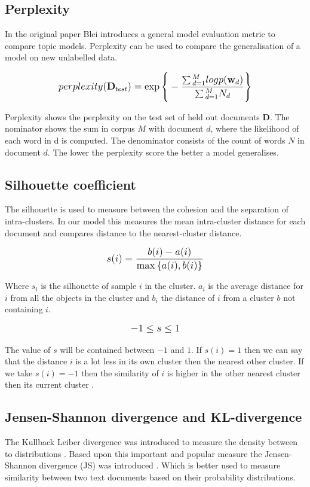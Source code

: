 \subsection{Perplexity}\label{result:perplexity}
In the original paper Blei introduces a general model evaluation metric \cite{Blei2003} to compare topic models. Perplexity can be used to compare the generalisation of a model on new unlabelled data.

\[
   \mathlarger{perplexity(\textbf{D}_{test}) = \exp{\Bigg \{ -\frac{\sum{}_{d=1}^{M}logp(\textbf{w}_d)}{\sum{}_{d=1}^{M}N_d} \Bigg \}}}
\]

Perplexity shows the perplexity on the test set of held out documents $\textbf{D}$. The nominator shows the sum in  corpus $M$ with document $d$, where the likelihood of each word in d is computed. The denominator consists of the count of words $N$ in document $d$.
The lower the perplexity score the better a model generalises. 


\subsection{Silhouette coefficient} \label{results:silhouette}
The silhouette is used to measure between the cohesion and the separation of intra-clusters. In our model this measures the mean intra-cluster distance for each document and compares distance to the nearest-cluster distance.

\[
   \mathlarger{s(i) = \frac{b(i) - a(i)}{\max{\{ a(i), b(i)}\} } }
\]

Where $s_i$ is the silhouette of sample $i$ in the cluster. $a_i$ is the average distance for $i$ from all the objects in the cluster and $b_i$ the distance of $i$ from a cluster $b$ not containing $i$. 

\[
\mathlarger{-1 \leq s \le 1}
\]

The value of $s$ will be contained between $-1$ and $1$. If $s(i) = 1$ then we can say that the distance $i$  is a lot less in its own cluster then the nearest other cluster. If we take $s(i) = -1$ then the similarity of $i$ is higher in the other nearest cluster then its current cluster \cite{Rousseeuw1987Silhouettes:Analysis}.


\subsection{Jensen-Shannon divergence and KL-divergence} \label{research:jsdivergence}
The Kullback Leiber divergence was introduced to measure the density between to distributions \cite{Hershey2007ApproximatingModels}. Based upon this important and popular measure the Jensen-Shannon divergence (JS) was introduced \cite{Fuglede2004Jensen-ShannonEmbedding}. Which is better used to measure similarity between two text documents based on their probability distributions.

